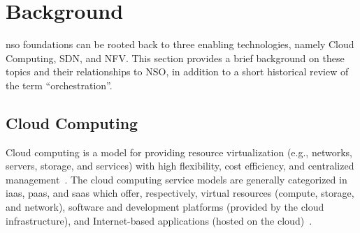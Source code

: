 \section{Background}
\label{sec:background}

\gls{nso} foundations can be rooted back to three enabling technologies, namely Cloud Computing, SDN, and NFV. This section provides a brief background on these topics and their relationships to NSO, in addition to a short historical review of the term ``orchestration''.

\subsection{Cloud Computing}
Cloud computing is a model for providing resource virtualization (e.g., networks, servers, storage, and services) with high flexibility, cost efficiency, and centralized management~\cite{Le2016SurveyNetworks}. The cloud computing service models are generally categorized in \gls{iaas}, \gls{paas}, and \gls{saas} which offer, respectively,  virtual resources (compute, storage, and network), software and development platforms (provided by the cloud infrastructure), and Internet-based applications (hosted on the cloud)~\cite{bele2018empirical}.





